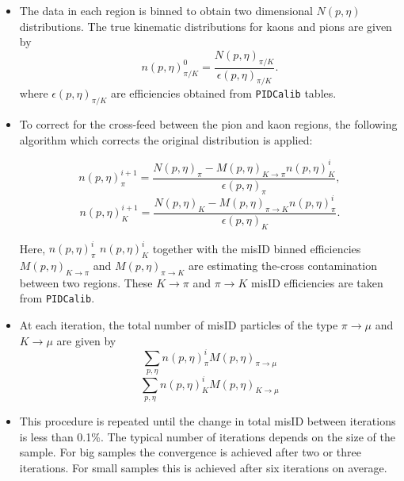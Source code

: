 \begin {itemize}
\begin{itemize}

\item The data in each region is binned to obtain two dimensional $N(p, \eta)$ distributions. The true kinematic distributions for kaons and pions are given by
\begin{equation}
n(p, \eta )^{0}_{\pi/K} = \frac{N(p, \eta )_{\pi/K}}{\epsilon(p,\eta )_{\pi/K}}.
\end{equation}
where $\epsilon(p,\eta)_{\pi/K}$ are efficiencies obtained from \texttt{PIDCalib} tables.

\item To correct for the cross-feed between the pion and kaon regions, the following algorithm which corrects the original distribution is applied:

\begin{equation}
n(p, \eta)^{i+1}_{\pi}=\frac{N(p, \eta)_{\pi}-M(p, \eta)_{K \rightarrow \pi} n(p, \eta)^{i}_{K}}{\epsilon(p,\eta)_{\pi}},
\end{equation}
\begin{equation}
n(p, \eta)^{i+1}_{K}=\frac{N(p, \eta)_{K}-M(p, \eta)_{\pi \rightarrow K} n(p, \eta)^{i}_{\pi}}{\epsilon(p,\eta)_{K}}.
\end{equation}

Here, $n(p, \eta)^{i}_{\pi}$  $n(p, \eta)^{i}_{K}$ together with the misID binned efficiencies $M(p, \eta )_{K \rightarrow \pi}$ and $M(p, \eta)_{\pi \rightarrow K}$ are estimating the-cross contamination between two regions. These ${K \rightarrow \pi}$ and ${\pi \rightarrow K}$ misID efficiencies are taken from \texttt{PIDCalib}.


\item At each iteration, the total number of misID particles of the type $\pi \rightarrow \mu$ and $K \rightarrow \mu$ are given by
\begin{equation}
\sum_{p,\eta} n(p, \eta)^{i}_{\pi} M(p, \eta)_{\pi\rightarrow\mu} 
\end{equation}
\begin{equation}
\sum_{p,\eta} n(p, \eta)^{i}_{K} M(p, \eta)_{K\rightarrow\mu}
\end{equation}
\item This procedure is repeated until the change in total misID between iterations is less than 0.1\%. The typical number of iterations depends on the size of the sample. For big samples the convergence is achieved after two or three iterations. For small samples this is achieved after six iterations on average.


\end{itemize}
\end{itemize}
